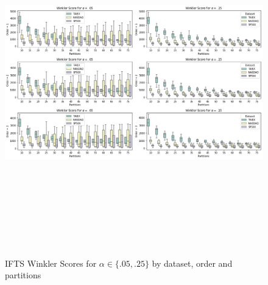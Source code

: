 \begin{figure}[htb]
    \centering
    \includegraphics[width=\textwidth,height=15cm]{figures/ifts_gridsearch.png}
    \caption{IFTS Winkler Scores for $\alpha \in \{.05, .25\}$ by dataset, order and partitions}
    \label{fig:ifts_gridsearch}
\end{figure}

